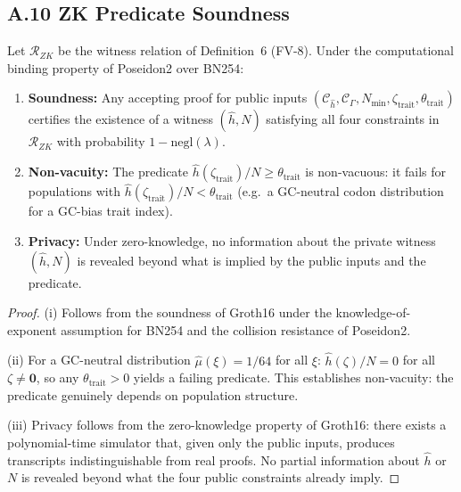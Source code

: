\documentclass[11pt]{article}
\begin{document}
\subsection*{A.10 \quad ZK Predicate Soundness}

\begin{theorem}\label{thm:zk}
Let $\mathcal{R}_{ZK}$ be the witness relation of Definition~6 (FV-8).
Under the computational binding property of Poseidon2 over BN254:
\begin{enumerate}[nosep,label=(\roman*)]
  \item \textbf{Soundness:} Any accepting proof for public inputs
        $(\mathcal{C}_{\hat{h}}, \mathcal{C}_\Gamma, N_{\min}, \zeta_{\text{trait}},
        \theta_{\text{trait}})$ certifies the existence of a witness
        $(\hat{h}, N)$ satisfying all four constraints in
        $\mathcal{R}_{ZK}$ with probability $1 - \mathrm{negl}(\lambda)$.
  \item \textbf{Non-vacuity:} The predicate
        $\hat{h}(\zeta_{\text{trait}})/N \ge \theta_{\text{trait}}$
        is non-vacuous: it fails for populations with
        $\hat{h}(\zeta_{\text{trait}})/N < \theta_{\text{trait}}$
        (e.g.\ a GC-neutral codon distribution for a GC-bias trait index).
  \item \textbf{Privacy:} Under zero-knowledge, no information about
        the private witness $(\hat{h}, N)$ is revealed beyond what is
        implied by the public inputs and the predicate.
\end{enumerate}
\end{theorem}

\begin{proof}
(i) Follows from the soundness of Groth16 under the knowledge-of-exponent
assumption for BN254 and the collision resistance of Poseidon2.

(ii) For a GC-neutral distribution $\hat{\mu}(\xi) = 1/64$ for all $\xi$:
$\hat{h}(\zeta)/N = 0$ for all $\zeta \ne \bm{0}$, so any
$\theta_{\text{trait}} > 0$ yields a failing predicate.  This establishes
non-vacuity: the predicate genuinely depends on population structure.

(iii) Privacy follows from the zero-knowledge property of Groth16: there
exists a polynomial-time simulator that, given only the public inputs,
produces transcripts indistinguishable from real proofs.  No partial
information about $\hat{h}$ or $N$ is revealed beyond what the four
public constraints already imply.
\end{proof}
\end{document}
